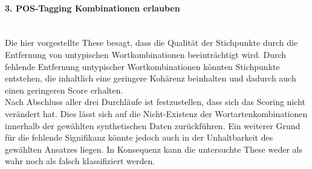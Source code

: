 \paragraph{3. POS-Tagging Kombinationen erlauben}\mbox{}\\
Die hier vorgestellte These besagt, dass die Qualität der Stichpunkte durch die Entfernung von untypischen Wortkombinationen beeinträchtigt wird. Durch fehlende Entfernung untypischer Wortkombinationen könnten Stichpunkte entstehen, die inhaltlich eine geringere Kohärenz beinhalten und dadurch auch einen geringeren Score erhalten.\\

Nach Abschluss aller drei Durchläufe ist festzustellen, dass sich das Scoring nicht verändert hat. Dies lässt sich auf die Nicht-Existenz der Wortartenkombinationen innerhalb der gewählten synthetischen Daten zurückführen. Ein weiterer Grund für die fehlende Signifikanz könnte jedoch auch in der Unhaltbarkeit des gewählten Ansatzes liegen. In Konsequenz kann die untersuchte These weder als wahr noch als falsch klassifiziert werden.
